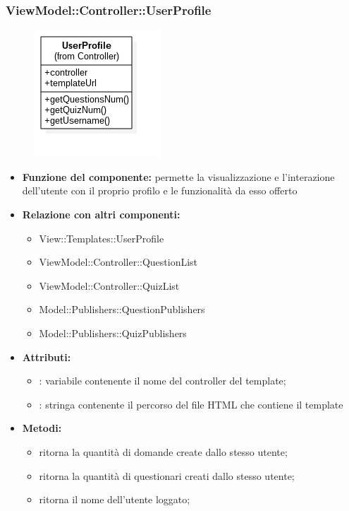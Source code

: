   \subsubsection{ViewModel::Controller::UserProfile}
  \begin{figure}[h!]
\begin{center}
	\includegraphics[scale=0.4]{../images/ViewModel/Controller/UserProfile.png}
\end{center}
\end{figure}
 \begin{itemize}
 \item\textbf{Funzione del componente:} permette la visualizzazione e l'interazione dell'utente con il proprio profilo e le funzionalità da esso offerto\\
 \item\textbf{Relazione con altri componenti:}
 \begin{itemize}
 	\item View::Templates::UserProfile
 	\item ViewModel::Controller::QuestionList
 	\item ViewModel::Controller::QuizList
 	\item Model::Publishers::QuestionPublishers
 	\item Model::Publishers::QuizPublishers
 \end{itemize}
 \item\textbf{Attributi:}
 \begin{itemize}
 	\item{}: variabile contenente il nome del controller del template;\\
		\item{}: stringa contenente il percorso del file HTML che contiene il template\\
 \end{itemize}
 \item\textbf{Metodi:}
 	\begin{itemize}
 		\item{} ritorna la quantità di domande create dallo stesso utente;\\
		\item{} ritorna la quantità di questionari creati dallo stesso utente;\\
		\item{} ritorna il nome dell'utente loggato;\\
 	\end{itemize}
 \end{itemize}
\newpage
 
